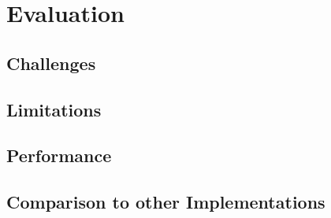 \chapter{Evaluation}

\section{Challenges}

\section{Limitations}

\section{Performance}

\section{Comparison to other Implementations}

